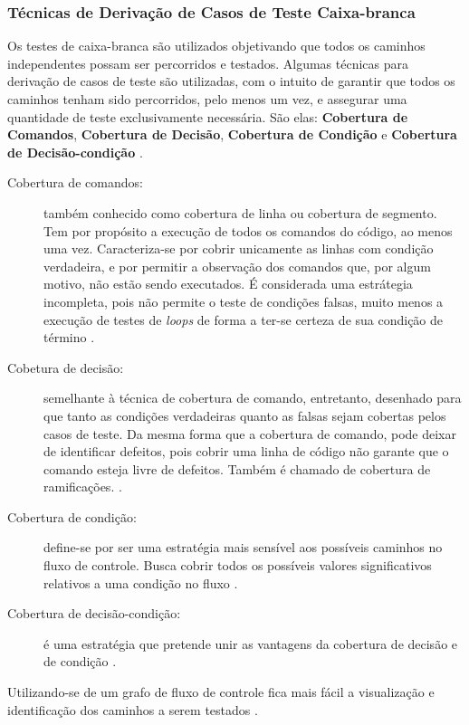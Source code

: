 \subsubsection{Técnicas de Derivação de Casos de Teste Caixa-branca}
Os testes de caixa-branca são utilizados objetivando que todos os caminhos independentes possam ser percorridos e testados. Algumas técnicas para derivação de casos de teste são utilizadas, com o intuito de garantir que todos os caminhos tenham sido percorridos, pelo menos um vez, e assegurar uma quantidade de teste exclusivamente necessária. São elas: \textbf{Cobertura de Comandos}, \textbf{Cobertura de Decisão}, \textbf{Cobertura de Condição} e \textbf{Cobertura de Decisão-condição} \cite{istqb2014}.

\begin{description}
\item[Cobertura de comandos:] também conhecido como cobertura de linha ou cobertura de segmento. Tem por propósito a execução de todos os comandos do código, ao menos uma vez. Caracteriza-se por cobrir unicamente as linhas com condição verdadeira, e por permitir a observação dos comandos que, por algum motivo, não estão sendo executados. É considerada uma estrátegia incompleta, pois não permite o teste de condições falsas, muito menos a execução de testes de \textit{loops} de forma a ter-se certeza de sua condição de término \cite{istqb2014}.
\item[Cobetura de decisão:] semelhante à técnica de cobertura de comando, entretanto, desenhado para que tanto as condições verdadeiras quanto as falsas sejam cobertas pelos casos de teste. Da mesma forma que a cobertura de comando, pode deixar de identificar defeitos, pois cobrir uma linha de código não garante que o comando esteja livre de defeitos. Também é chamado de cobertura de ramificações. \cite{istqb2014}.
\item[Cobertura de condição:] define-se por ser uma estratégia mais sensível aos possíveis caminhos no fluxo de controle. Busca cobrir todos os possíveis valores significativos relativos a uma condição no fluxo \cite{istqb2014}.
\item[Cobertura de decisão-condição:] é uma estratégia que pretende unir as vantagens da cobertura de decisão e de condição \cite{istqb2014}.
\end{description}
\par
\indent Utilizando-se de um grafo de fluxo de controle fica mais fácil a visualização e identificação dos caminhos a serem testados \cite{copeland2003}.
\par
